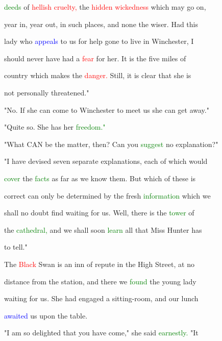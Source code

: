  \textcolor{green}{deeds} of \textcolor{red}{hellish} \textcolor{red}{cruelty,} the \textcolor{red}{hidden} \textcolor{red}{wickedness} which may go on,

 year in, year out, in such places, and none the wiser. Had this

 lady who \textcolor{blue}{appeals} to us for help gone to live in Winchester, I

 should never have had a \textcolor{red}{fear} for her. It is the five miles of

 country which makes the \textcolor{red}{danger.} Still, it is clear that she is

 not personally \textcolor{BurntOrange}{threatened."}



 "No. If she can come to Winchester to meet us she can get away."



 "Quite so. She has her \textcolor{green}{freedom."}



 "What CAN be the matter, then? Can you \textcolor{green}{suggest} no explanation?"



 "I have devised seven separate explanations, each of which would

 \textcolor{green}{cover} the \textcolor{green}{facts} as far as we know them. But which of these is

 correct can only be determined by the fresh \textcolor{green}{information} which we

 shall no \textcolor{BurntOrange}{doubt} find \textcolor{BurntOrange}{waiting} for us. Well, there is the \textcolor{green}{tower} of

 the \textcolor{green}{cathedral,} and we shall soon \textcolor{green}{learn} all that Miss \textcolor{BurntOrange}{Hunter} has

 to tell."



 The \textcolor{red}{Black} Swan is an inn of repute in the High Street, at no

 distance from the station, and there we \textcolor{green}{found} the \textcolor{BurntOrange}{young} lady

 \textcolor{BurntOrange}{waiting} for us. She had engaged a sitting-room, and our lunch

 \textcolor{blue}{awaited} us upon the table.



 "I am so \textcolor{BurntOrange}{delighted} that you have come," she said \textcolor{green}{earnestly.} "It

